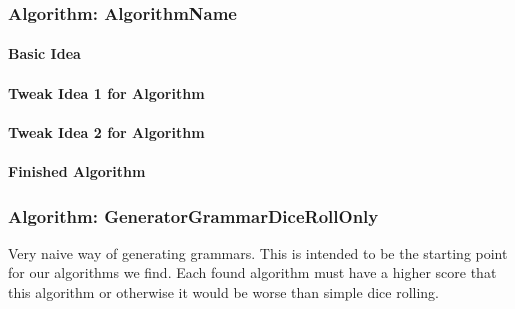 \pagebreak

\subsubsection{Algorithm: AlgorithmName}

\paragraph{Basic Idea}

\paragraph{Tweak Idea 1 for Algorithm}

\paragraph{Tweak Idea 2 for Algorithm}

\paragraph{Finished Algorithm}



\pagebreak

\subsubsection{Algorithm: GeneratorGrammarDiceRollOnly}
\noindent Very naive way of generating grammars. This is intended to be the starting point for our algorithms we find. Each found algorithm must have a higher score that this algorithm or otherwise it would be worse than simple dice rolling. \\

